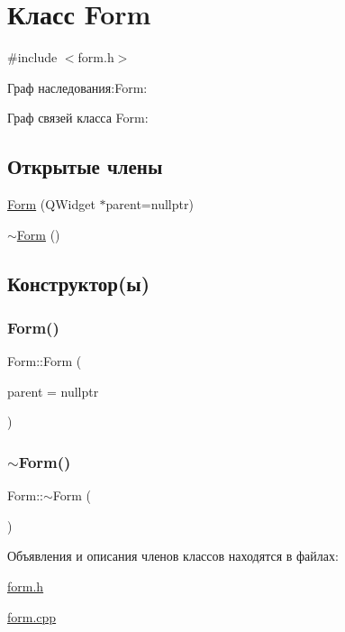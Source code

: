 \hypertarget{class_form}{}\section{Класс Form}
\label{class_form}


{\ttfamily \#include $<$form.\+h$>$}



Граф наследования\+:Form\+:


Граф связей класса Form\+:
\subsection*{Открытые члены}
\begin{DoxyCompactItemize}
\item 
\hyperlink{class_form_a23cb20192cdf7cf444d109b53e036ad0}{Form} (Q\+Widget $\ast$parent=nullptr)
\item 
\hyperlink{class_form_a9cda7cce41e81bfaca51e922d4f9b98f}{$\sim$\+Form} ()
\end{DoxyCompactItemize}


\subsection{Конструктор(ы)}
\mbox{\label{class_form_a23cb20192cdf7cf444d109b53e036ad0}} 
\subsubsection{\texorpdfstring{Form()}{Form()}}
{\footnotesize\ttfamily Form\+::\+Form (\begin{DoxyParamCaption}\item[{Q\+Widget $\ast$}]{parent = {\ttfamily nullptr} }\end{DoxyParamCaption})\hspace{0.3cm}{\ttfamily [explicit]}}

\mbox{\label{class_form_a9cda7cce41e81bfaca51e922d4f9b98f}} 
\subsubsection{\texorpdfstring{$\sim$\+Form()}{~Form()}}
{\footnotesize\ttfamily Form\+::$\sim$\+Form (\begin{DoxyParamCaption}{ }\end{DoxyParamCaption})}



Объявления и описания членов классов находятся в файлах\+:\begin{DoxyCompactItemize}
\item 
\hyperlink{form_8h}{form.\+h}\item 
\hyperlink{form_8cpp}{form.\+cpp}\end{DoxyCompactItemize}
